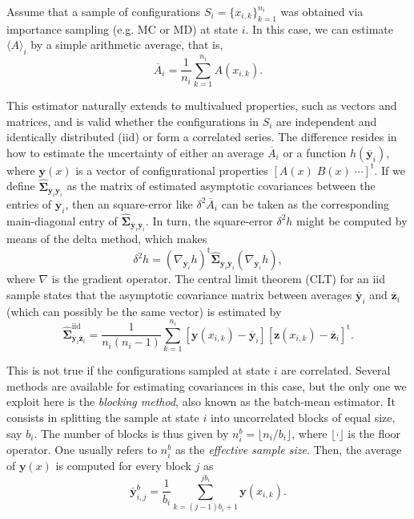 \documentclass[aip,jcp,reprint,amsmath,amssymb]{revtex4-1}
\newcommand{\mt}[1]{\boldsymbol{\mathbf{#1}}}           %
\newcommand{\vt}[1]{\boldsymbol{\mathbf{#1}}}           %
\newcommand{\tr}[1]{#1^\text{t}}                        %
\begin{document}
Assume that a sample of configurations $S_i = \{x_{i,k}\}_{k=1}^{n_i}$ was obtained via importance sampling\cite{Allen_1987} (e.g. MC or MD) at state $i$. In this case, we can estimate $\langle A \rangle_i$ by a simple arithmetic average, that is,
\begin{equation}
\label{eq:average_estimator}
\overline A_i = \frac{1}{n_i} \sum_{k=1}^{n_i} A(x_{i,k}).
\end{equation}

This estimator naturally extends to multivalued properties, such as vectors and matrices, and is valid whether the configurations in $S_i$ are independent and identically distributed (iid) or form a correlated series. The difference resides in how to estimate the uncertainty of either an average $\overline A_i$ or a function $h(\overline {\vt y}_i)$, where $\vt y(x)$ is a vector of configurational properties $\tr{[A(x) \; B(x) \; \cdots]}$. If we define $\hat{\mt \Sigma}_{\overline{\vt y}_i\overline{\vt y}_i}$ as the matrix of estimated asymptotic covariances between the entries of $\overline{\vt y}_i$, then an square-error like $\delta^2 \overline A_i$ can be taken as the corresponding main-diagonal entry of $\hat{\mt \Sigma}_{\overline{\vt y}_i\overline{\vt y}_i}$. In turn, the square-error $\delta^2 h$ might be computed by means of the delta method,\cite{Greene_2012} which makes
\begin{equation}
\label{eq:delta method}
\delta^2 h = \tr{(\nabla_{\overline{\vt y}_i} h)} \hat{\mt \Sigma}_{\overline{\vt y}_i\overline{\vt y}_i}(\nabla_{\overline{\vt y}_i} h),
\end{equation} 
where $\nabla$ is the gradient operator. The central limit theorem (CLT) for an iid sample states that the asymptotic covariance matrix between averages $\overline{\vt y}_i$ and $\overline{\vt z}_i$ (which can possibly be the same vector) is estimated by
\begin{equation*}
\label{eq:asymptotic covariance IID}
\hat{\mt \Sigma}^\text{iid}_{\overline{\vt y}_i\overline{\vt z}_i} = \frac{1}{n_i(n_i - 1)} \sum\limits_{k=1}^{n_i} \left[\vt y(x_{i,k}) - \overline{\vt y}_i\right] \tr{\left[\vt z(x_{i,k}) - \overline{\vt z}_i\right]}.
\end{equation*}

This is not true if the configurations sampled at state $i$ are correlated. Several methods\cite{X} are available for estimating covariances in this case, but the only one we exploit here is the \textit{blocking method}, also known as the batch-mean estimator. It consists in splitting the sample at state $i$ into uncorrelated blocks of equal size, say $b_i$. The number of blocks is thus given by $n^b_i = \lfloor n_i/b_i \rfloor$, where $\lfloor \cdot \rfloor$ is the floor operator. One usually refers to $n^b_i$ as the \textit{effective sample size}. Then, the average of $\vt y(x)$ is computed for every block $j$ as
\begin{equation*}
{\overline{\vt y}}^b_{i,j} = \frac{1}{b_i} \sum_{k=(j-1)b_i+1}^{j b_i} \vt y(x_{i,k}).
\end{equation*}
\end{document}
